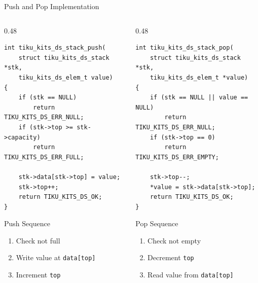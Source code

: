 \documentclass[aspectratio=169, 10pt]{beamer}
\begin{document}
\begin{frame}[fragile]{Push and Pop Implementation}
\begin{columns}[T]
\begin{column}{0.48\textwidth}
\begin{lstlisting}[style=cstyle,
  title={push --- write at top, increment}]
int tiku_kits_ds_stack_push(
    struct tiku_kits_ds_stack *stk,
    tiku_kits_ds_elem_t value)
{
    if (stk == NULL)
        return TIKU_KITS_DS_ERR_NULL;
    if (stk->top >= stk->capacity)
        return TIKU_KITS_DS_ERR_FULL;

    stk->data[stk->top] = value;
    stk->top++;
    return TIKU_KITS_DS_OK;
}
\end{lstlisting}

\vspace{0.3em}
\begin{block}{Push Sequence}
\begin{enumerate}
  \item Check not full
  \item Write value at \texttt{data[top]}
  \item Increment \texttt{top}
\end{enumerate}
\end{block}
\end{column}

\begin{column}{0.48\textwidth}
\begin{lstlisting}[style=cstyle,
  title={pop --- decrement top, read}]
int tiku_kits_ds_stack_pop(
    struct tiku_kits_ds_stack *stk,
    tiku_kits_ds_elem_t *value)
{
    if (stk == NULL || value == NULL)
        return TIKU_KITS_DS_ERR_NULL;
    if (stk->top == 0)
        return TIKU_KITS_DS_ERR_EMPTY;

    stk->top--;
    *value = stk->data[stk->top];
    return TIKU_KITS_DS_OK;
}
\end{lstlisting}

\vspace{0.3em}
\begin{block}{Pop Sequence}
\begin{enumerate}
  \item Check not empty
  \item Decrement \texttt{top}
  \item Read value from \texttt{data[top]}
\end{enumerate}
\end{block}
\end{column}
\end{columns}
\end{frame}
\end{document}
